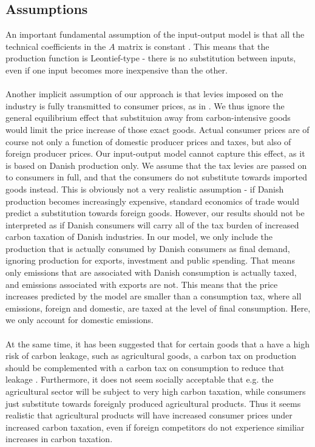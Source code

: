 \subsection{Assumptions}\label{sec:io-assumptions}
An important fundamental assumption of the input-output model is that all the technical coefficients in the $A$ matrix is constant \citep{miller_blair_2009}. This means that the production function is Leontief-type - there is no substitution between inputs, even if one input becomes more inexpensive than the other. 
\\
\\
Another implicit assumption of our approach is that levies imposed on the industry is fully transmitted to consumer prices, as in \cite{Wier2005}. We thus ignore the general equilibrium effect that substituion away from carbon-intensive goods would limit the price increase of those exact goods. 
Actual consumer prices are of course not only a function of domestic producer prices and taxes, but also of foreign producer prices. Our input-output model cannot capture this effect, as it is based on Danish production only. We assume that the tax levies are passed on to consumers in full, and that the consumers do not substitute towards imported goods instead. This is obviously not a very realistic assumption - if Danish production becomes increasingly expensive, standard economics of trade would predict a substitution towards foreign goods. However, our results should not be interpreted as if Danish consumers will carry all of the tax burden of increased carbon taxation of Danish industries. In our model, we only include the production that is actually consumed by Danish consumers as final demand, ignoring production for exports, investment and public spending. That means only emissions that are associated with Danish consumption is actually taxed, and emissions associated with exports are not. This means that the price increases predicted by the model are smaller than a consumption tax, where all emissions, foreign and domestic, are taxed at the level of final consumption. Here, we only account for domestic emissions.
\\
\\
At the same time, it has been suggested that for certain goods that a have a high risk of carbon leakage, such as agricultural goods, a carbon tax on production should be complemented with a carbon tax on consumption to reduce that leakage \citep{klimaraad2021}. Furthermore, it does not seem socially acceptable that e.g. the agricultural sector will be subject to very high carbon taxation, while consumers just substitute towards foreignly produced agricultural products. Thus it seems realistic that agricultural products will have increased consumer prices under increased carbon taxation, even if foreign competitors do not experience similiar increases in carbon taxation. 

